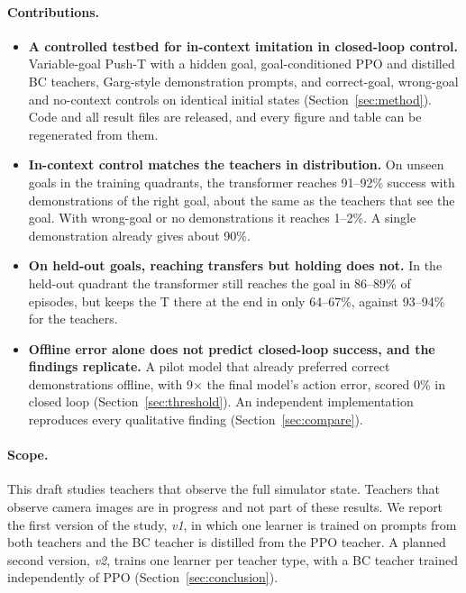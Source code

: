 \paragraph{Contributions.}
\begin{itemize}
  \item \textbf{A controlled testbed for in-context imitation in closed-loop control.} Variable-goal Push-T with a hidden goal,
    goal-conditioned PPO and distilled BC teachers, Garg-style demonstration prompts, and correct-goal, wrong-goal and no-context
    controls on identical initial states (Section~\ref{sec:method}). Code and all result files are released, and every figure and
    table can be regenerated from them.
  \item \textbf{In-context control matches the teachers in distribution.} On unseen goals in the training quadrants, the transformer
    reaches 91--92\% success with demonstrations of the right goal, about the same as the teachers that see the goal. With wrong-goal
    or no demonstrations it reaches 1--2\%. A single demonstration already gives about 90\%.
  \item \textbf{On held-out goals, reaching transfers but holding does not.} In the held-out quadrant the transformer still reaches
    the goal in 86--89\% of episodes, but keeps the T there at the end in only 64--67\%, against 93--94\% for the teachers.
  \item \textbf{Offline error alone does not predict closed-loop success, and the findings replicate.} A pilot model that
    already preferred correct demonstrations offline, with 9$\times$ the final model's action error, scored 0\% in closed loop
    (Section~\ref{sec:threshold}). An independent implementation reproduces every qualitative finding (Section~\ref{sec:compare}).
\end{itemize}

\paragraph{Scope.} This draft studies teachers that observe the full simulator state. Teachers that observe camera images are in
progress and not part of these results. We report the first version of the study, \emph{v1}, in which one learner is trained on
prompts from both teachers and the BC teacher is distilled from the PPO teacher. A planned second version, \emph{v2}, trains one
learner per teacher type, with a BC teacher trained independently of PPO (Section~\ref{sec:conclusion}).
